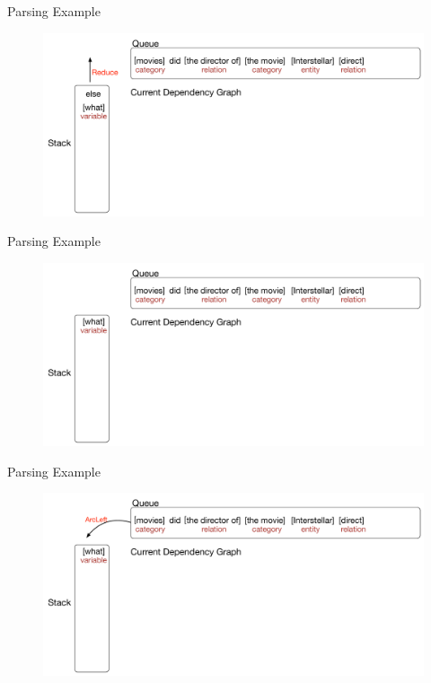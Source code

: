 \documentclass{beamer}
\begin{document}
\begin{frame}{Parsing Example}
	\begin{figure}
		\centering\includegraphics[width=1.0\textwidth]{introduction/parsing_examples/5.pdf}
	\end{figure}	
\end{frame}

\begin{frame}{Parsing Example}
	\begin{figure}
		\centering\includegraphics[width=1.0\textwidth]{introduction/parsing_examples/6.pdf}
	\end{figure}	
\end{frame}

\begin{frame}{Parsing Example}
	\begin{figure}
		\centering\includegraphics[width=1.0\textwidth]{introduction/parsing_examples/7.pdf}
	\end{figure}	
\end{frame}
\end{document}
